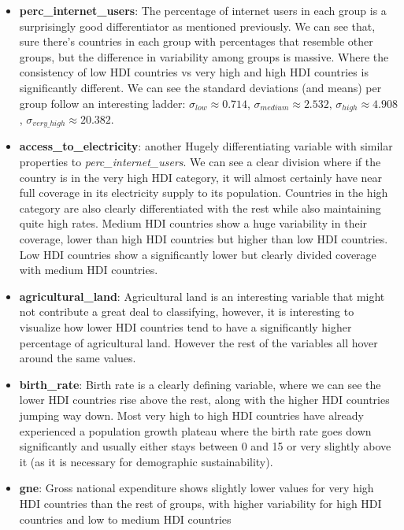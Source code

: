 \documentclass[]{article}
\providecommand{\tightlist}{%
  \setlength{\itemsep}{0pt}\setlength{\parskip}{0pt}}
\begin{document}
\begin{itemize}
\tightlist
\item
  \textbf{perc\_internet\_users}: The percentage of internet users in
  each group is a surprisingly good differentiator as mentioned
  previously. We can see that, sure there's countries in each group with
  percentages that resemble other groups, but the difference in
  variability among groups is massive. Where the consistency of low HDI
  countries vs very high and high HDI countries is significantly
  different. We can see the standard deviations (and means) per group
  follow an interesting ladder: \(\sigma_{low} \approx 0.714\),
  \(\sigma_{medium} \approx 2.532\), \(\sigma_{high} \approx 4.908\),
  \(\sigma_{very\_high} \approx 20.382\).
\item
  \textbf{access\_to\_electricity}: another Hugely differentiating
  variable with similar properties to \emph{perc\_internet\_users}. We
  can see a clear division where if the country is in the very high HDI
  category, it will almost certainly have near full coverage in its
  electricity supply to its population. Countries in the high category
  are also clearly differentiated with the rest while also maintaining
  quite high rates. Medium HDI countries show a huge variability in
  their coverage, lower than high HDI countries but higher than low HDI
  countries. Low HDI countries show a significantly lower but clearly
  divided coverage with medium HDI countries.
\item
  \textbf{agricultural\_land}: Agricultural land is an interesting
  variable that might not contribute a great deal to classifying,
  however, it is interesting to visualize how lower HDI countries tend
  to have a significantly higher percentage of agricultural land.
  However the rest of the variables all hover around the same values.
\item
  \textbf{birth\_rate}: Birth rate is a clearly defining variable, where
  we can see the lower HDI countries rise above the rest, along with the
  higher HDI countries jumping way down. Most very high to high HDI
  countries have already experienced a population growth plateau where
  the birth rate goes down significantly and usually either stays
  between 0 and 15 or very slightly above it (as it is necessary for
  demographic sustainability).
\item
  \textbf{gne}: Gross national expenditure shows slightly lower values
  for very high HDI countries than the rest of groups, with higher
  variability for high HDI countries and low to medium HDI countries

\end{itemize}
\end{document}
